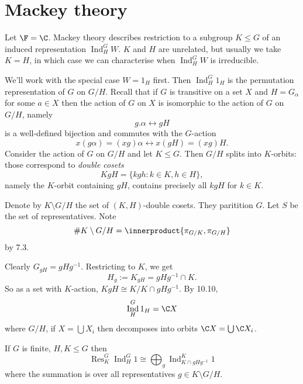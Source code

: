 \documentclass[a4paper]{article}
\newcommand*{\ip}{\innerproduct} %
\DeclareMathOperator{\Res}{Res} %
\DeclareMathOperator{\Ind}{Ind} %
\theoremstyle{definition}
\begin{document}
\section{Mackey theory}

Let \(\F = \C\). Mackey theory describes restriction to a subgroup \(K \leq G\) of an induced representation \(\Ind_H^G W\). \(K\) and \(H\) are unrelated, but usually we take \(K = H\), in which case we can characterise when \(\Ind_H^G W\) is irreducible.

We'll work with the special case \(W = 1_H\) first. Then \(\Ind_H^G 1_H\) is the permutation representation of \(G\) on \(G/H\). Recall that if \(G\) is transitive on a set \(X\) and \(H = G_\alpha\) for some \(a \in X\) then the action of \(G\) on \(X\) is isomorphic to the action of \(G\) on \(G/H\), namely
\[
  g . \alpha \leftrightarrow gH
  \tag{*, 12. 1}
\]
is a well-defined bijection and commutes with the \(G\)-action
\[
  x(g\alpha) = (xg) \alpha \leftrightarrow x(gH) = (xg)H.
\]
Consider the action of \(G\) on \(G/H\) and let \(K \leq G\). Then \(G/H\) splits into \(K\)-orbits: those correspond to \emph{double cosets}
\[
  KgH = \{kgh: k \in K, h \in H\},
\]
namely the \(K\)-orbit containing \(gH\), contains precisely all \(kgH\) for \(k \in K\).

\begin{notation}
  Denote by \(K \setminus G/H\) the set of \((K, H)\)-double cosets. They paritition \(G\). Let \(S\) be the set of representatives. Note
  \[
    \# K \setminus G /H = \ip{\pi_{G/K}, \pi_{G/H}}
  \]
  by 7.3.
\end{notation}

  Clearly \(G_{gH} = gHg^{-1}\). Restricting to \(K\), we get
  \[
    H_g := K_{gH} = gHg^{-1} \cap K.
  \]
  So as a set with \(K\)-action, \(KgH \cong K/K \cap gHg^{-1}\). By 10.10,
  \[
    \Ind_H^G 1_H = \C X
  \]
where \(G/H\), if \(X = \bigcup X_i\) then decomposes into orbits \(\C X = \bigcup \C X_i\).

\begin{proposition}
  If \(G\) is finite, \(H, K \leq G\) then
  \[
    \Res_K^G \Ind_H^G 1 \cong \bigoplus_g \Ind_{K \cap gHg^{-1}}^K 1
  \]
  where the summation is over all representatives \(g \in K \setminus G/H\).
\end{proposition}
\end{document}
